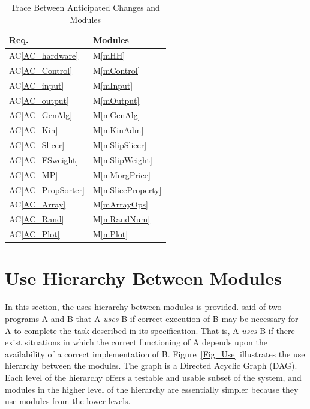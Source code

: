 \documentclass[12pt, titlepage]{article}
\newcommand{\acref}[1]{AC\ref{#1}}
\newcommand{\mref}[1]{M\ref{#1}}
\begin{document}
\begin{table}[h!]
\centering
\begin{tabular}{ll}
\toprule
\textbf{Req.} & \textbf{Modules}\\
\midrule
\acref{AC_hardware} & \mref{mHH}\\
\acref{AC_Control} & \mref{mControl}\\
\acref{AC_input} & \mref{mInput}\\
\acref{AC_output}& \mref{mOutput}\\
\acref{AC_GenAlg}& \mref{mGenAlg}\\
\acref{AC_Kin}& \mref{mKinAdm}\\
\acref{AC_Slicer} & \mref{mSlipSlicer}\\
\acref{AC_FSweight}& \mref{mSlipWeight}\\
\acref{AC_MP} & \mref{mMorgPrice}\\
\acref{AC_PropSorter}& \mref{mSliceProperty}\\
\acref{AC_Array} & \mref{mArrayOps}\\
\acref{AC_Rand} & \mref{mRandNum}\\
\acref{AC_Plot} & \mref{mPlot}\\
\bottomrule
\end{tabular}
\caption{Trace Between Anticipated Changes and Modules}
\label{Table:AC}
\end{table}

\section{Use Hierarchy Between Modules} \label{SecUse}

\hspace{3ex}In this section, the uses hierarchy between modules is
provided. \cite{Parnas1978} said of two programs A and B that A {\em
  uses} B if correct execution of B may be necessary for A to complete
the task described in its specification. That is, A {\em uses} B if
there exist situations in which the correct functioning of A depends
upon the availability of a correct implementation of B. 
Figure~\ref{Fig_Use} illustrates the use hierarchy between the modules. The
graph is a Directed Acyclic Graph (DAG). Each level of the hierarchy
offers a testable and usable subset of the system, and modules in the
higher level of the hierarchy are essentially simpler because they use
modules from the lower levels.
\end{document}
